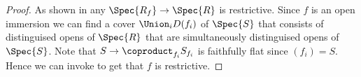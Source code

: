 
\begin{proof}
As shown in  any $\Spec{R_f} \rightarrow \Spec{R}$ is restrictive.
Since $f$ is an open immersion 
we can find a cover $\Union_i D(f_i)$ of $\Spec{S}$
that consists of distinguised opens of $\Spec{R}$
that are simultaneously distinguised opens of $\Spec{S}$.
Note that $S \rightarrow \coproduct_{f_i} S_{f_i}$ is faithfully flat since $(f_i) = S$.
Hence we can invoke  to get that $f$ is restrictive. 









\end{proof}
